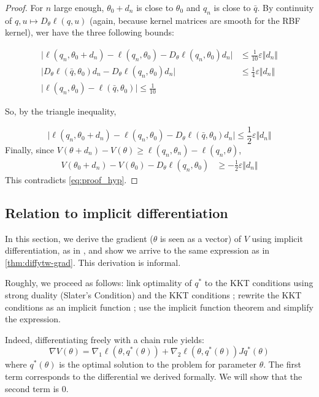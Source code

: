 \begin{proof}
   For $n$ large enough, $\theta_0 + d_n$ is close to $\theta_0$ and $q_n$ is close to $\bar q$. By continuity of $q, u \mapsto D_\theta\ell(q, u)$ (again, because kernel matrices are smooth for the RBF kernel), wer have the three following bounds:

   \begin{align}
       \vert \ell(q_n, \theta_0 + d_n) - \ell(q_n, \theta_0) - D_\theta \ell(q_n, \theta_0)d_n\vert &\leq \frac{1}{10} \varepsilon \Vert d_n \Vert\\
        \vert D_\theta \ell(\bar q, \theta_0)d_n - D_\theta \ell(q_n, \theta_0)d_n\vert &\leq \frac{1}{4}\varepsilon \Vert d_n \Vert\\
        \vert \ell(q_n, \theta_0) - \ell(\bar q, \theta_0) \vert \leq \frac{1}{10}
    \end{align}

    So, by the triangle inequality,

    \begin{equation}
       \vert \ell(q_n, \theta_0 + d_n) - \ell(q_n, \theta_0) - D_\theta \ell(\bar q, \theta_0)d_n\vert \leq \frac{1}{2} \varepsilon \Vert d_n \Vert
    \end{equation}
    Finally, since $V(\theta + d_n) - V(\theta) \geq \ell(q_n, \theta_n) - \ell(q_n, \theta)$,
    \begin{align}
        V(\theta_0 + d_n) - V(\theta_0) - D_\theta \ell(q_n, \theta_0)&\geq-\frac{1}{2}\varepsilon\Vert d_n\Vert
    \end{align}
    This contradicts \cref{eq:proof_hyp}.
\end{proof}






\subsection{Relation to implicit differentiation}\label{sec:lagrangian}
In this section, we derive the gradient ($\theta$ is seen as a vector) of $V$ using implicit differentiation, as in \cite{QP-Layer,optnet}, and show we arrive to the same expression as in \cref{thm:diffytw-grad}. This derivation is informal.


Roughly, we proceed as follows: link optimality of $q^*$ to the KKT conditions using strong duality (Slater's Condition) and the KKT conditions ; rewrite the KKT conditions as an implicit function ; use the implicit function theorem and simplify the expression.

Indeed, differentiating freely with a chain rule yields:
\begin{equation}\label{eq:lagrangian-first}
    \nabla V(\theta) = \nabla_1 \ell(\theta, q^*(\theta)) + \nabla_2 \ell(\theta, q^*(\theta))J q^*(\theta)
\end{equation}
where $q^*(\theta)$ is the optimal solution to the problem for parameter $\theta$. The first term corresponds to the differential we derived formally. We will show that the second term is $0$.

